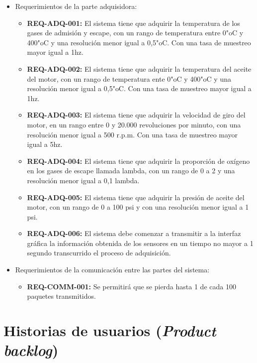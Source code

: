 \documentclass[11pt]{charter}
\begin{document}
\begin{itemize}
\begin{itemize}
	\end{itemize}
\item Requerimientos de la parte adquisidora:
	\begin{itemize}
	\item \textbf{REQ-ADQ-001:} El sistema tiene que adquirir la temperatura de los gases de admisión y escape, con un rango de temperatura entre 0"oC y 400"oC y una resolución menor igual a 0,5"oC. Con una tasa de muestreo mayor igual a 1hz.
	\item \textbf{REQ-ADQ-002:} El sistema tiene que adquirir la temperatura del aceite del motor, con un rango de temperatura ente 0"oC y 400"oC y una resolución menor igual a 0,5"oC. Con una tasa de muestreo mayor igual a 1hz.
	\item \textbf{REQ-ADQ-003:} El sistema tiene que adquirir la velocidad de giro del motor, en un rango entre 0 y 20.000 revoluciones por minuto, con una resolución menor igual a 500 r.p.m. Con una tasa de muestreo mayor igual a 5hz.
	\item \textbf{REQ-ADQ-004:} El sistema tiene que adquirir la proporción de oxígeno en los gases de escape llamada lambda, con un rango de 0 a 2 y una resolución menor igual a 0,1 lambda.
	\item \textbf{REQ-ADQ-005:} El sistema tiene que adquirir la presión de aceite del motor, con un rango de 0 a 100 psi y con una resolución menor igual a 1 psi.
	\item \textbf{REQ-ADQ-006:} El sistema debe comenzar a transmitir a la interfaz gráfica la información obtenida de los sensores en un tiempo no mayor a 1 segundo transcurrido el proceso de adquisición.
	
	\end{itemize}
\item Requerimientos de la comunicación entre las partes del sistema:
	\begin{itemize}
	\item \textbf{REQ-COMM-001:} Se permitirá que se pierda hasta 1 de cada 100 paquetes transmitidos.	
	\end{itemize}
\end{itemize}

\section{Historias de usuarios (\textit{Product backlog})}
\label{sec:backlog}
\end{document}
